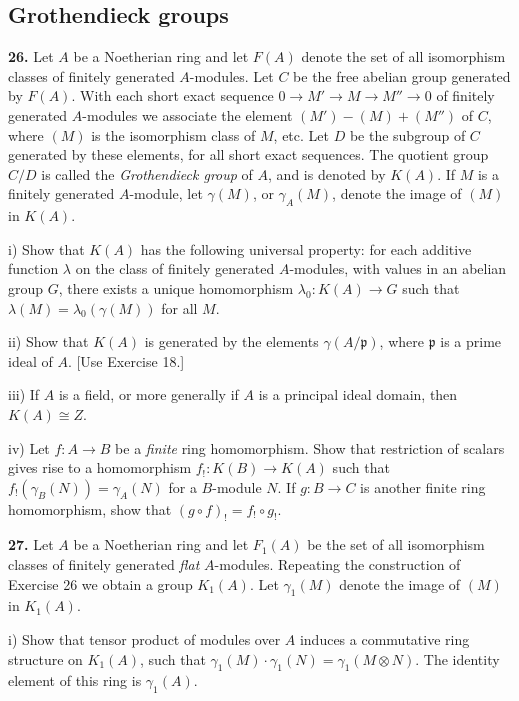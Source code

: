 
\subsection{Grothendieck groups}

\noindent\textbf{26.} Let \(A\) be a Noetherian ring and let \(F(A)\) denote the set of all isomorphism classes of finitely generated \(A\)-modules. Let \(C\) be the free abelian group generated by \(F(A)\). With each short exact sequence \(0\to M'\to M\to M''\to0\) of finitely generated \(A\)-modules we associate the element \((M')-(M)+(M'')\) of \(C\), where \((M)\) is the isomorphism class of \(M\), etc. Let \(D\) be the subgroup of \(C\) generated by these elements, for all short exact sequences. The quotient group \(C/D\) is called the \emph{Grothendieck group} of \(A\), and is denoted by \(K(A)\). If \(M\) is a finitely generated \(A\)-module, let \(\gamma(M)\), or \(\gamma_A(M)\), denote the image of \((M)\) in \(K(A)\).

i) Show that \(K(A)\) has the following universal property: for each additive function \(\lambda\) on the class of finitely generated \(A\)-modules, with values in an abelian group \(G\), there exists a unique homomorphism \(\lambda_0:K(A)\to G\) such that \(\lambda(M)=\lambda_0(\gamma(M))\) for all \(M\).

ii) Show that \(K(A)\) is generated by the elements \(\gamma(A/\mathfrak p)\), where \(\mathfrak p\) is a prime ideal of \(A\). [Use Exercise 18.]

iii) If \(A\) is a field, or more generally if \(A\) is a principal ideal domain, then \(K(A)\cong Z\).

iv) Let \(f:A\to B\) be a \emph{finite} ring homomorphism. Show that restriction of scalars gives rise to a homomorphism \(f_!:K(B)\to K(A)\) such that \(f_!(\gamma_B(N))=\gamma_A(N)\) for a \(B\)-module \(N\). If \(g:B\to C\) is another finite ring homomorphism, show that \((g\circ f)_!=f_!\circ g_!\).

\noindent\textbf{27.} Let \(A\) be a Noetherian ring and let \(F_1(A)\) be the set of all isomorphism classes of finitely generated \emph{flat} \(A\)-modules. Repeating the construction of Exercise 26 we obtain a group \(K_1(A)\). Let \(\gamma_1(M)\) denote the image of \((M)\) in \(K_1(A)\).

i) Show that tensor product of modules over \(A\) induces a commutative ring structure on \(K_1(A)\), such that \(\gamma_1(M)\cdot\gamma_1(N)=\gamma_1(M\otimes N)\). The identity element of this ring is \(\gamma_1(A)\).

